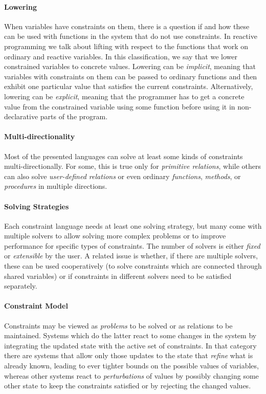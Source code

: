 \paragraph*{Lowering}
When variables have constraints on them, there is a question if and how these
can be used with functions in the system that do not use constraints. In
reactive programming we talk about lifting with respect to the functions that
work on ordinary and reactive variables. In this classification, we say that we
lower constrained variables to concrete values. Lowering can be \emph{implicit},
meaning that variables with constraints on them can be passed to ordinary
functions and then exhibit one particular value that satisfies the current
constraints. Alternatively, lowering can be \emph{explicit}, meaning that the
programmer has to get a concrete value from the constrained variable using some
function before using it in non-declarative parts of the program.
\paragraph*{Multi-directionality}
Most of the presented languages can solve at least some kinds of constraints
multi-directionally. For some, this is true only for \emph{primitive relations},
while others can also solve \emph{user-defined relations} or even ordinary
\emph{functions}, \emph{methods}, or \emph{procedures} in multiple directions.
\paragraph*{Solving Strategies}
Each constraint language needs at least one solving strategy, but many come with
multiple solvers to allow solving more complex problems or to improve
performance for specific types of constraints. The number of solvers is either
\emph{fixed} or \emph{extensible} by the user. A related issue is whether, if
there are multiple solvers, these can be used cooperatively (\eg to solve
constraints which are connected through shared variables) or if constraints in
different solvers need to be satisfied separately.
\paragraph*{Constraint Model}
Constraints may be viewed as \emph{problems} to be solved or as relations to be
maintained. Systems which do the latter react to some changes in the system by
integrating the updated state with the active set of constraints. In that
category there are systems that allow only those updates to the state that
\emph{refine} what is already known, leading to ever tighter bounds on the
possible values of variables, whereas other systems react to
\emph{perturbations} of values by possibly changing some other state to keep the
constraints satisfied or by rejecting the changed values.

